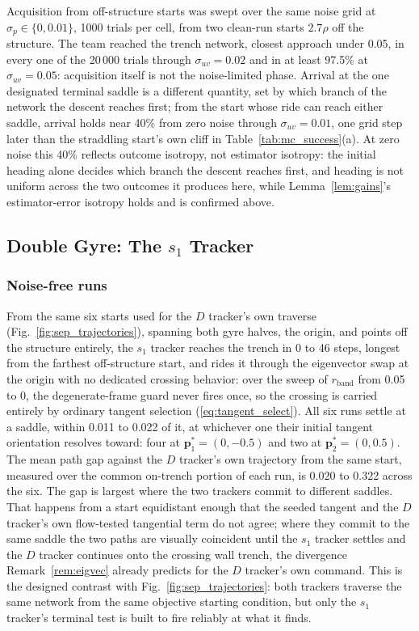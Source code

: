 \documentclass[lettersize,journal]{IEEEtran}
\begin{document}
Acquisition from off-structure starts was swept over the same noise
grid at $\sigma_p \in \{0, 0.01\}$, 1000 trials per cell, from two
clean-run starts $2.7\rho$ off the structure. The team reached the
trench network, closest approach under 0.05, in every one of the
20\,000 trials through $\sigma_{uv} = 0.02$ and in at least 97.5\% at
$\sigma_{uv} = 0.05$: acquisition itself is not the noise-limited
phase. Arrival at the one designated terminal saddle is a different
quantity, set by which branch of the network the descent reaches first;
from the start whose ride can reach either saddle, arrival holds near
40\% from zero noise through $\sigma_{uv} = 0.01$, one grid step later
than the straddling start's own cliff in Table~\ref{tab:mc_success}(a).
At zero noise this 40\% reflects outcome isotropy, not estimator
isotropy: the initial heading alone decides which branch the descent
reaches first, and heading is not uniform across the two outcomes it
produces here, while Lemma~\ref{lem:gains}'s estimator-error isotropy
holds and is confirmed above.

\subsection{Double Gyre: The $s_1$ Tracker}
\label{sec:results_oecs}

\subsubsection{Noise-free runs}
From the same six starts used for the $D$ tracker's own traverse
(Fig.~\ref{fig:sep_trajectories}), spanning both gyre halves, the
origin, and points off the structure entirely, the $s_1$ tracker reaches
the trench in 0 to 46 steps, longest from the farthest off-structure
start, and rides it through the eigenvector swap at the origin with no
dedicated crossing behavior: over the sweep of $r_{\text{band}}$ from
0.05 to 0, the degenerate-frame
guard never fires once, so the
crossing is carried entirely by ordinary tangent selection
(\ref{eq:tangent_select}). All six runs settle at a saddle, within
0.011 to 0.022 of it, at whichever one their initial tangent
orientation resolves toward: four at $\mathbf{p}^*_1 = (0, -0.5)$ and
two at $\mathbf{p}^*_2 = (0, 0.5)$. The mean
path gap against the $D$ tracker's own trajectory from the same start,
measured over the common on-trench portion of each run, is 0.020 to
0.322 across the six. The gap is largest where the two trackers commit
to different saddles. That happens from a start equidistant enough that
the seeded tangent and the $D$ tracker's own flow-tested tangential term
do not agree; where they commit to the same saddle the two paths are visually
coincident until the $s_1$ tracker settles and the $D$ tracker continues
onto the crossing wall trench, the divergence Remark~\ref{rem:eigvec}
already predicts for the $D$ tracker's own command. This is the
designed contrast with Fig.~\ref{fig:sep_trajectories}: both trackers
traverse the same network from the same objective starting condition,
but only the $s_1$ tracker's terminal test is built to fire reliably at
what it finds.
\end{document}
